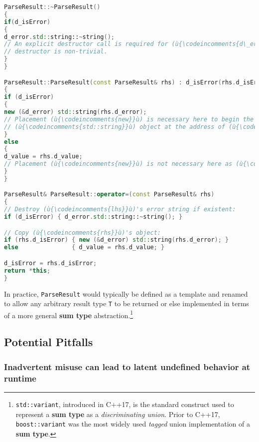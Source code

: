 \begin{lstlisting}[language=C++]
ParseResult::~ParseResult()
{
if(d_isError)
{
d_error.std::string::~string();
// An explicit destructor call is required for (ù{\codeincomments{d\_error}}ù) because its
// destructor is non-trivial.
}
}

ParseResult::ParseResult(const ParseResult& rhs) : d_isError(rhs.d_isError)
{
if (d_isError)
{
new (&d_error) std::string(rhs.d_error);
// Placement (ù{\codeincomments{new}}ù) is necessary here to begin the lifetime of a
// (ù{\codeincomments{std::string}}ù) object at the address of (ù{\codeincomments{d\_error}}ù).
}
else
{
d_value = rhs.d_value;
// Placement (ù{\codeincomments{new}}ù) is not necessary here as (ù{\codeincomments{int}}ù) is a trivial type.
}
}

ParseResult& ParseResult::operator=(const ParseResult& rhs)
{
// Destroy (ù{\codeincomments{lhs}}ù)'s error string if existent:
if (d_isError) { d_error.std::string::~string(); }

// Copy (ù{\codeincomments{rhs}}ù)'s object:
if (rhs.d_isError) { new (&d_error) std::string(rhs.d_error); }
else               { d_value = rhs.d_value; }

d_isError = rhs.d_isError;
return *this;
}
\end{lstlisting}

\noindent In practice, \texttt{ParseResult} would typically be defined as a
template and renamed to allow any arbitrary result type \texttt{T} to be
returned or else implemented in terms of a more general \textbf{sum
type} abstraction.{\cprotect\footnote{\texttt{std::variant}, introduced
in C++17, is the standard construct used to represent a \textbf{sum
type} as a \emph{discriminating union}. Prior to C++17,
\texttt{boost::variant} was the most widely used \emph{tagged} union
implementation of a \textbf{sum type}.}}

\subsection[Potential Pitfalls]{Potential Pitfalls}\label{potential-pitfalls}

\subsubsection[Inadvertent misuse can lead to latent \textbf{undefined behavior}\glossary{undefined behavior} at runtime]{Inadvertent misuse can lead to latent \textbf{undefined behavior} at runtime}\label{inadvertent-misuse-can-lead-to-latent-undefined-behavior-at-runtime}

